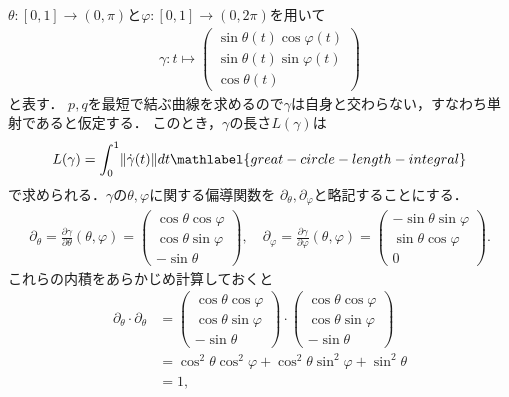 \documentclass{ltjsbook}
\begin{document}
\(\theta \colon [0, 1] \to (0, \pi)\)と\(\varphi\colon [0, 1] \to (0, 2\pi)\)を用いて
\begin{align*}
    \gamma \colon t \mapsto
        \begin{pmatrix}
            \sin \theta(t) \cos \varphi(t) \\
            \sin \theta(t) \sin \varphi(t) \\
            \cos \theta(t)
        \end{pmatrix}
\end{align*}
と表す．
\(p, q\)を最短で結ぶ曲線を求めるので\(\gamma\)は自身と交わらない，すなわち単射であると仮定する．
このとき，\(\gamma\)の長さ\(L(\gamma)\)は
\begin{align}
    L(\gamma) = \int_{0}^{1} \lVert \dot{\gamma}(t) \rVert  dt
    \mathlabel{great-circle-length-integral}
\end{align}
で求められる．\(\gamma\)の\(\theta, \varphi\)に関する偏導関数を
\(\partial_\theta, \partial_\varphi\)と略記することにする．
\begin{align*}
    \partial_\theta
    = \frac{\partial \gamma}{\partial \theta}(\theta, \varphi)
    =
    \begin{pmatrix}
        \cos \theta \cos \varphi \\
        \cos \theta \sin \varphi \\
        - \sin \theta
    \end{pmatrix},
    \quad
    \partial_\varphi
    = \frac{\partial \gamma}{\partial \varphi}(\theta, \varphi)
    =
    \begin{pmatrix}
        - \sin \theta \sin \varphi \\
        \sin \theta \cos \varphi \\
        0
    \end{pmatrix}.
\end{align*}
これらの内積をあらかじめ計算しておくと
\begin{align*}
    \partial_\theta \cdot \partial_\theta
    &=
    \begin{pmatrix}
        \cos \theta \cos \varphi \\
        \cos \theta \sin \varphi \\
        - \sin \theta
    \end{pmatrix}
    \cdot
    \begin{pmatrix}
        \cos \theta \cos \varphi \\
        \cos \theta \sin \varphi \\
        - \sin \theta
    \end{pmatrix} \\
    &= \cos^2 \theta \cos^2 \varphi
        + \cos^2 \theta \sin^2 \varphi
        + \sin^2 \theta \\
    &= 1,
\end{align*}
\end{document}
